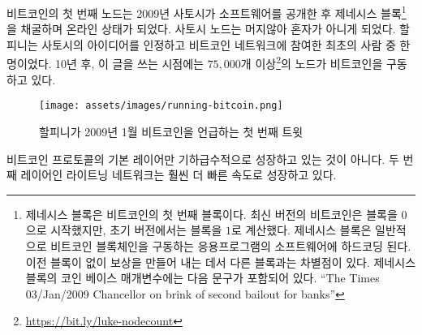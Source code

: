 \begin{comment}
	Bitcoin's first node went online in 2009 after Satoshi mined the \textit{genesis
		block}\footnote{The genesis block is the first block of the Bitcoin block chain.
		Modern versions of Bitcoin number it as block $0$, though very early versions
		counted it as block $1$. The genesis block is usually hardcoded into the
		software of the applications that utilize the Bitcoin block chain. It is a
		special case in that it does not reference a previous block and produces an
		unspendable subsidy. The \textit{coinbase} parameter contains, along with the
		normal data, the following text: \textit{\enquote{The Times 03/Jan/2009 Chancellor on
				brink of second bailout for banks}} \cite{btcwiki:genesis-block}} and released
	the software into the wild. His node wasn't alone for long. Hal Finney was one
	of the first people to pick up on the idea and join the network. Ten years
	later, as of this writing, more than
	$75.000$\footnote{\url{https://bit.ly/luke-nodecount}} nodes are running
	bitcoin.
\end{comment}
비트코인의 첫 번째 노드는 2009년 사토시가 소프트웨어를 공개한 후 제네시스 블록\footnote{
	제네시스 블록은 비트코인의 첫 번째 블록이다. 최신 버전의 비트코인은
	블록을 $0$으로 시작했지만, 초기 버전에서는 블록을 $1$로 계산했다.
	제네시스 블록은 일반적으로 비트코인 블록체인을 구동하는 응용프로그램의 소프트웨어에
	하드코딩 된다. 이전 블록이 없이 보상을 만들어 내는 데서 다른 블록과는 차별점이 있다.
	제네시스 블록의 코인 베이스 매개변수에는 다음 문구가 포함되어 있다.
	\enquote{The Times 03/Jan/2009 Chancellor on brink of second bailout for banks}\cite{btcwiki:genesis-block}}
을 채굴하며 온라인 상태가 되었다.
사토시 노드는 머지않아 혼자가 아니게 되었다.
할 피니는 사토시의 아이디어를 인정하고 비트코인 네트워크에 참여한 최초의 사람 중 한 명이었다.
10년 후, 이 글을 쓰는 시점에는 $75,000$개 이상\footnote{\url{https://bit.ly/luke-nodecount}}의 노드가 비트코인을 구동하고 있다.

\begin{figure}
	\centering
	\texttt{[image: assets/images/running-bitcoin.png]}
	\caption{할피니가 2009년 1월 비트코인을 언급하는 첫 번째 트윗}
	\label{fig:running-bitcoin}
\end{figure}

\begin{comment}
	The protocol's base layer isn't the only thing growing exponentially.
	The lightning network, a second layer technology, is growing at an even
	faster rate.
\end{comment}
비트코인 프로토콜의 기본 레이어만 기하급수적으로 성장하고 있는 것이 아니다.
두 번째 레이어인 라이트닝 네트워크는 훨씬 더 빠른 속도로 성장하고 있다.

